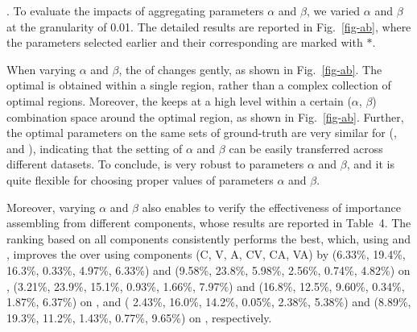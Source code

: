 
.
To evaluate the impacts of aggregating parameters $\alpha$ and $\beta$, we varied $\alpha$ and $\beta$ at the granularity of 0.01.
The detailed results are reported in Fig.~\ref{fig-ab}, where the parameters selected earlier and their corresponding \PairAcc are marked with $*$.

When varying $\alpha$ and $\beta$, the \PairAcc of \ensemblerank changes gently, as shown in Fig.~\ref{fig-ab}.
The optimal \PairAcc is obtained within a single region, rather than a complex collection of optimal regions.
%
Moreover, the \PairAcc keeps at a high level within a certain ($\alpha$, $\beta$) combination space around the optimal region, as shown in Fig.~\ref{fig-ab}.
%
Further, the optimal parameters on the same sets of ground-truth are very similar for (\aan, \aminer and \magdata), indicating that the setting of $\alpha$ and $\beta$ can be easily transferred across different datasets.
To conclude, \ensemblerank is very robust to parameters $\alpha$ and $\beta$, and it is quite flexible for choosing proper values of parameters $\alpha$ and $\beta$.

Moreover, varying $\alpha$ and $\beta$ also enables to verify the effectiveness of importance assembling from different components, whose results are reported in Table~4.
The ranking based on all components consistently performs the best, which, using \recom and \fcita, improves the \PairAcc over using components (C, V, A, CV, CA, VA) by (6.33\%, 19.4\%, 16.3\%, 0.33\%, 4.97\%, 6.33\%) and (9.58\%, 23.8\%, 5.98\%, 2.56\%, 0.74\%, 4.82\%) on \aan, (3.21\%, 23.9\%, 15.1\%, 0.93\%, 1.66\%, 7.97\%) and (16.8\%, 12.5\%, 9.60\%, 0.34\%, 1.87\%, 6.37\%) on \aminer, and ( 2.43\%, 16.0\%, 14.2\%, 0.05\%, 2.38\%, 5.38\%) and (8.89\%, 19.3\%, 11.2\%, 1.43\%, 0.77\%, 9.65\%) on \magdata, respectively.


